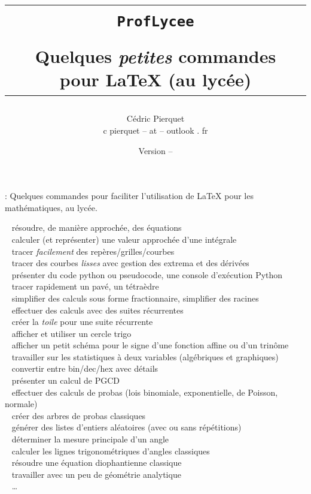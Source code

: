 \documentclass[a4paper,french,11pt]{article}
\title{%
\begin{minipage}{0.85\linewidth}
	\begin{tcolorbox}[colframe=yellow,colback=yellow!15]
		\begin{center}
			\begin{tabular}{c}
				\lstinline!ProfLycee!\\
				\\
				Quelques \textit{petites} commandes pour  \LaTeX{} (au lycée)
			\end{tabular}
		\end{center}
	\end{tcolorbox}
\end{minipage}
}
\author{
	\begin{tabular}{c}
		Cédric Pierquet\\
		{\ttfamily c pierquet -- at -- outlook . fr}
	\end{tabular}
}
\date{Version \PLversion{} -- \PLdate}
\newcommand\deblst{{\tiny\faCode}~}
\begin{document}
\setlength{\aweboxleftmargin}{0.07\linewidth}
\setlength{\aweboxcontentwidth}{0.93\linewidth}
\setlength{\aweboxvskip}{8pt}

\pagestyle{fancy}

\maketitle

\thispagestyle{empty}

{ : Quelques commandes pour faciliter l'utilisation de \LaTeX{} pour les mathématiques, au lycée.}

\medskip

{\footnotesize\noindent%
{\deblst} résoudre, de manière approchée, des équations\\
{\deblst} calculer (et représenter) une valeur approchée d'une intégrale\\
{\deblst} tracer \textit{facilement} des repères/grilles/courbes\\
{\deblst} tracer  des courbes \textit{lisses} avec gestion des extrema et des dérivées\\
{\deblst} présenter du code \textsf{python} ou \textsf{pseudocode}, une console d'exécution \textsf{Python} \\
{\deblst} tracer rapidement un pavé, un tétraèdre \\
{\deblst} simplifier des calculs sous forme fractionnaire, simplifier des racines \\
{\deblst} effectuer des calculs avec des suites récurrentes \\
{\deblst} créer la \textit{toile} pour une suite récurrente \\
{\deblst} afficher et utiliser un cercle trigo \\
{\deblst} afficher un petit schéma pour le signe d'une fonction affine ou d'un trinôme \\
{\deblst} travailler sur les statistiques à deux variables (algébriques et graphiques) \\
{\deblst} convertir entre bin/dec/hex avec détails \\
{\deblst} présenter un calcul de PGCD \\
{\deblst} effectuer des calculs de probas (lois binomiale, exponentielle, de Poisson, normale) \\
{\deblst} créer des arbres de probas \og classiques \fg \\
{\deblst} générer des listes d'entiers aléatoires (avec ou sans répétitions)\\
{\deblst} déterminer la mesure principale d'un angle \\
{\deblst} calculer les lignes trigonométriques d'angles \og classiques \fg{} \\
{\deblst} résoudre une équation diophantienne \og classique \fg{} \\
{\deblst} travailler avec un peu de géométrie analytique \\
{\deblst} \ldots}
\end{document}
